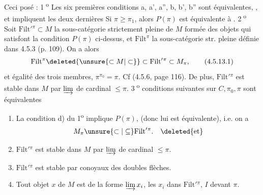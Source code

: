 Ceci posé : \textcircled{1\textsuperscript{o}} Les six premières conditions a, a', a'', b, b', b'' sont équivalentes, , et impliquent les deux dernières
Si $\pi\geq\pi_1$, alors $P(\pi)$ est équivalente à .
\textcircled{2\textsuperscript{o}} Soit $\mathrm{Filt}'{}^\pi\subset M$ la sous-catégorie strictement pleine de $M$ formée des objets qui satisfont la condition $P(\pi)$ ci-dessus, et $\mathrm{Filt}^\pi$ la sous-catégorie str. pleine définie dans 4.5.3 (p. 109). On a alors
\[
\mathrm{Filt}^\pi\deleted{\unsure{\subset M|\subset}}\subset\mathrm{Filt}'{}^\pi\subset M_\pi,
\tag*{(4.5.13.1)}
\]
et   égalité des trois membres,   $\pi^{\pi_0}=\pi$. Cf  (4.5.6, page 116). De plus, $\mathrm{Filt}'{}^\pi$ est stable dans $M$ par $\varinjlim$ de cardinal $\leq\pi$.
\textcircled{3\textsuperscript{o}}  conditions suivantes sur $C,\pi_0,\pi$ sont équivalentes
\begin{enumerate}[label={},leftmargin=2em]
\item[3)] La condition d) du 1\textsuperscript{o} implique $P(\pi)$, (donc lui est équivalente), i.e. on a
\[
M_\pi\unsure{\subset|\subseteq}\mathrm{Filt}'{}^\pi.\quad\deleted{\text{et}}
\]
\item[1)] $\mathrm{Filt}'{}^\pi$ est stable dans $M$ par $\varinjlim$ de cardinal $\leq\pi$.
\item[1')] $\mathrm{Filt}'{}^\pi$ est stable par  conoyaux des doubles flèches.
\item[2)] Tout objet $x$ de $M$ est de la forme $\varinjlim x_i$, les $x_i$ dans $\mathrm{Filt}'{}^\pi$, $I$  devant $\pi$.
\end{enumerate}
